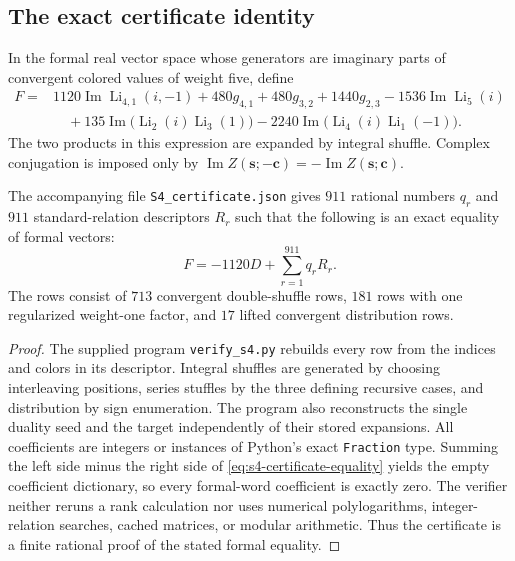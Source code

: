 \subsection{The exact certificate identity}
In the formal real vector space whose generators are imaginary parts of
convergent colored values of weight five, define
\begin{align}
 F={}&1120\operatorname{Im}\operatorname{Li}_{4,1}(i,-1)
       +480g_{4,1}+480g_{3,2}+1440g_{2,3}
       -1536\operatorname{Im}\operatorname{Li}_5(i)\nonumber\\
 &\quad+135\operatorname{Im}\bigl(\operatorname{Li}_2(i)
                                      \operatorname{Li}_3(1)\bigr)
       -2240\operatorname{Im}\bigl(\operatorname{Li}_4(i)
                                      \operatorname{Li}_1(-1)\bigr).
 \label{eq:s4-certificate-target}
\end{align}
The two products in this expression are expanded by integral shuffle.
Complex conjugation is imposed only by
$\operatorname{Im}Z(\boldsymbol s;-\boldsymbol c)
=-\operatorname{Im}Z(\boldsymbol s;\boldsymbol c)$.

\begin{lemma}\label{lem:s4-certificate}
The accompanying file \texttt{S4\_certificate.json} gives $911$ rational
numbers $q_r$ and $911$ standard-relation descriptors $R_r$ such that the
following is an exact equality of formal vectors:
\begin{equation}\label{eq:s4-certificate-equality}
 F=-1120D+\sum_{r=1}^{911}q_rR_r.
\end{equation}
The rows consist of $713$ convergent double-shuffle rows, $181$ rows with
one regularized weight-one factor, and $17$ lifted convergent distribution
rows.
\end{lemma}
\begin{proof}
The supplied program \texttt{verify\_s4.py} rebuilds every row from the
indices and colors in its descriptor. Integral shuffles are generated by
choosing interleaving positions, series stuffles by the three defining
recursive cases, and distribution by sign enumeration. The program also
reconstructs the single duality seed and the target independently of their
stored expansions. All coefficients are integers or instances of Python's
exact \texttt{Fraction} type. Summing the left side minus the right side of
\eqref{eq:s4-certificate-equality} yields the empty coefficient dictionary,
so every formal-word coefficient is exactly zero. The verifier neither
reruns a rank calculation nor uses numerical polylogarithms, integer-relation
searches, cached matrices, or modular arithmetic. Thus the certificate is
a finite rational proof of the stated formal equality.
\end{proof}

